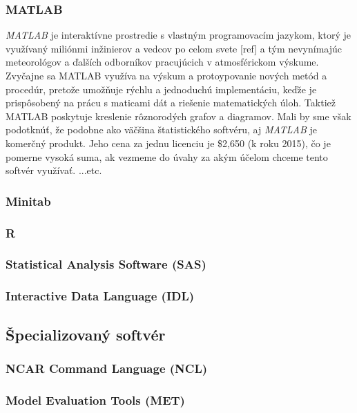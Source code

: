 \subsubsection{MATLAB} %
\textit{MATLAB} je interaktívne prostredie s vlastným programovacím jazykom, ktorý je využívaný miliónmi inžinierov a vedcov po celom svete [ref] a tým nevynímajúc meteorológov a ďalších odborníkov pracujúcich v atmosférickom výskume.
Zvyčajne sa MATLAB využíva na výskum a protoypovanie nových metód a procedúr, pretože umožňuje rýchlu a jednoduchú implementáciu, keďže je prispôsobený na prácu s maticami dát a riešenie matematických úloh. Taktiež MATLAB poskytuje kreslenie rôznorodých grafov a diagramov.
Mali by sme však podotknúť, že podobne ako väčšina štatistického softvéru, aj \textit{MATLAB} je komerčný produkt. Jeho cena za jednu licenciu je \$2,650 (k roku 2015), čo je pomerne vysoká suma, ak vezmeme do úvahy za akým účelom chceme tento softvér využívať. ...etc.

\subsubsection{Minitab}

\subsubsection{R}

\subsubsection[SAS]{Statistical Analysis Software (SAS)}

\subsubsection[IDL]{Interactive Data Language (IDL)}

\subsection{Špecializovaný softvér}

\subsubsection[NCL]{NCAR Command Language (NCL)}

\subsubsection[MET]{Model Evaluation Tools (MET)}

